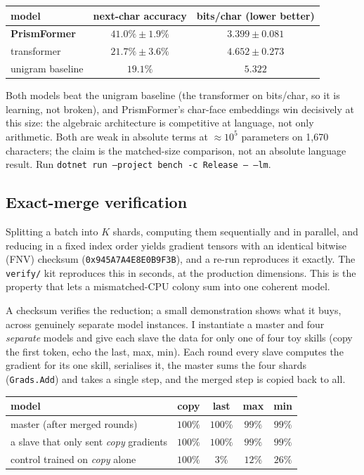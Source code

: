 \documentclass[11pt]{article}
\newcommand{\code}[1]{\texttt{#1}}
\begin{document}
\begin{center}
\begin{tabular}{@{}lcc@{}}
\toprule
model & next-char accuracy & bits/char (lower better) \\
\midrule
\textbf{PrismFormer} & $\mathbf{41.0\% \pm 1.9\%}$ & $\mathbf{3.399 \pm 0.081}$ \\
transformer          & $21.7\% \pm 3.6\%$          & $4.652 \pm 0.273$ \\
unigram baseline     & $19.1\%$                    & $5.322$ \\
\bottomrule
\end{tabular}
\end{center}

Both models beat the unigram baseline (the transformer on bits/char, so it is learning, not broken),
and PrismFormer's char-face embeddings win decisively at this size: the algebraic architecture is
competitive at language, not only arithmetic. Both are weak in absolute terms at $\approx 10^5$
parameters on 1{,}670 characters; the claim is the matched-size comparison, not an absolute language
result. Run \code{dotnet run --project bench -c Release -- --lm}.

\subsection{Exact-merge verification}\label{sec:exactmerge}

Splitting a batch into $K$ shards, computing them sequentially and in parallel, and reducing in a fixed
index order yields gradient tensors with an identical bitwise (FNV) checksum
(\code{0x945A7A4E8E0B9F3B}), and a re-run reproduces it exactly. The \code{verify/} kit reproduces this
in seconds, at the production dimensions. This is the property that lets a mismatched-CPU colony sum into
one coherent model.

A checksum verifies the reduction; a small demonstration shows what it buys, across genuinely separate
model instances. I instantiate a master and four \emph{separate} models and give each slave the data for
only one of four toy skills (copy the first token, echo the last, max, min). Each round every slave
computes the gradient for its one skill, serialises it, the master sums the four shards (\code{Grads.Add})
and takes a single step, and the merged step is copied back to all.

\begin{center}
\begin{tabular}{@{}lcccc@{}}
\toprule
model & copy & last & max & min \\
\midrule
master (after merged rounds)                     & $100\%$ & $100\%$ & $99\%$ & $99\%$ \\
a slave that only sent \emph{copy} gradients     & $100\%$ & $100\%$ & $99\%$ & $99\%$ \\
control trained on \emph{copy} alone             & $100\%$ & $3\%$   & $12\%$ & $26\%$ \\
\bottomrule
\end{tabular}
\end{center}
\end{document}
